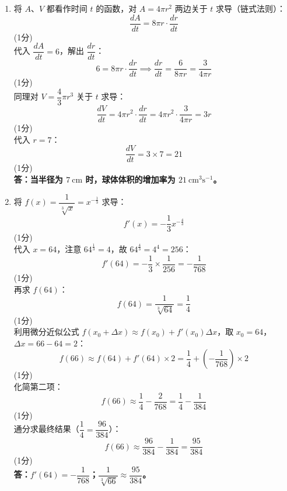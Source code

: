 \documentclass[12pt,a4paper]{exam-zh}
\begin{document}
\begin{solution}
    \begin{enumerate}[label=(\alph*)]
        \item 将 $A$、$V$ 都看作时间 $t$ 的函数，对 $A = 4\pi r^2$ 两边关于 $t$ 求导（链式法则）： \\
        $$\frac{dA}{dt} = 8\pi r \cdot \frac{dr}{dt}$$ \hfill (1分) \\
        代入 $\dfrac{dA}{dt} = 6$，解出 $\dfrac{dr}{dt}$： \\
        $$6 = 8\pi r \cdot \frac{dr}{dt} \implies \frac{dr}{dt} = \frac{6}{8\pi r} = \frac{3}{4\pi r}$$ \hfill (1分) \\
        同理对 $V = \dfrac{4}{3}\pi r^3$ 关于 $t$ 求导： \\
        $$\frac{dV}{dt} = 4\pi r^2 \cdot \frac{dr}{dt} = 4\pi r^2 \cdot \frac{3}{4\pi r} = 3r$$ \hfill (1分) \\
        代入 $r = 7$： \\
        $$\frac{dV}{dt} = 3 \times 7 = 21$$ \hfill (1分) \\
        \textbf{答：当半径为 $7\ \text{cm}$ 时，球体体积的增加率为 $21\ \text{cm}^3\text{s}^{-1}$。}

        \item 将 $f(x) = \dfrac{1}{\sqrt[3]{x}} = x^{-\frac{1}{3}}$ 求导： \\
        $$f'(x) = -\frac{1}{3}x^{-\frac{4}{3}}$$ \hfill (1分) \\
        代入 $x = 64$，注意 $64^{\frac{1}{3}} = 4$，故 $64^{\frac{4}{3}} = 4^4 = 256$： \\
        $$f'(64) = -\frac{1}{3} \times \frac{1}{256} = -\frac{1}{768}$$ \hfill (1分) \\
        再求 $f(64)$： \\
        $$f(64) = \frac{1}{\sqrt[3]{64}} = \frac{1}{4}$$ \hfill (1分) \\
        利用微分近似公式 $f(x_0 + \Delta x) \approx f(x_0) + f'(x_0)\Delta x$，取 $x_0 = 64$，$\Delta x = 66 - 64 = 2$： \\
        $$f(66) \approx f(64) + f'(64) \times 2 = \frac{1}{4} + \left(-\frac{1}{768}\right) \times 2$$ \hfill (1分) \\
        化简第二项： \\
        $$f(66) \approx \frac{1}{4} - \frac{2}{768} = \frac{1}{4} - \frac{1}{384}$$ \hfill (1分) \\
        通分求最终结果（$\dfrac{1}{4} = \dfrac{96}{384}$）： \\
        $$f(66) \approx \frac{96}{384} - \frac{1}{384} = \frac{95}{384}$$ \hfill (1分) \\
        \textbf{答：$f'(64) = -\dfrac{1}{768}$；$\dfrac{1}{\sqrt[3]{66}} \approx \dfrac{95}{384}$。}
    \end{enumerate}
\end{solution}
\end{document}
